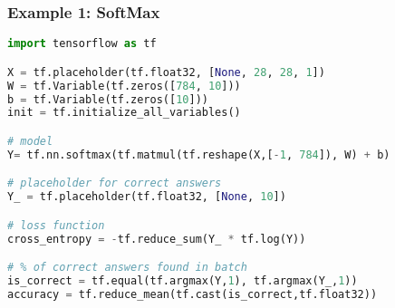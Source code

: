 \begin{frame}[fragile]
  \MyLogo
  \frametitle{Example 1: SoftMax}  
 
\scriptsize{
\begin{lstlisting}[language=python]
import tensorflow as tf    

X = tf.placeholder(tf.float32, [None, 28, 28, 1])     
W = tf.Variable(tf.zeros([784, 10]))    
b = tf.Variable(tf.zeros([10]))   
init = tf.initialize_all_variables() 

# model
Y= tf.nn.softmax(tf.matmul(tf.reshape(X,[-1, 784]), W) + b)  

# placeholder for correct answers    
Y_ = tf.placeholder(tf.float32, [None, 10])  

# loss function   
cross_entropy = -tf.reduce_sum(Y_ * tf.log(Y))  

# % of correct answers found in batch
is_correct = tf.equal(tf.argmax(Y,1), tf.argmax(Y_,1))  
accuracy = tf.reduce_mean(tf.cast(is_correct,tf.float32))  
\end{lstlisting}
}

\end{frame}


